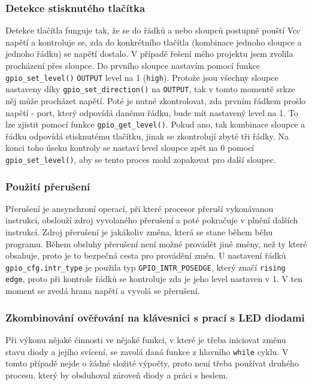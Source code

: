 \documentclass[a4paper, 11pt]{article}
\begin{document}
\subsubsection{Detekce stisknutého tlačítka}
Detekce tlačítla funguje tak, že se do řádků a nebo sloupců postupně pouští Vcc napětí a kontroluje se, zda do konkrétního tlačítla (kombinace jednoho sloupce a jednoho řádku) se napětí dostalo. V případě řešení mého projektu jsem zvolila procházení přes sloupce. Do prvního sloupce nastavím pomocí funkce \verb!gpio_set_level()! \verb!OUTPUT! level na 1 (\verb!high!). Protože jsou všechny sloupce nastaveny díky \verb!gpio_set_direction()! na \verb!OUTPUT!, tak v tomto momentě srkze něj může procházet napětí. Poté je nutné zkontrolovat, zda prvním řádkem prošlo napětí - port, který odpovídá danému řádku, bude mít nastavený level na 1. To lze zjistit pomocí funkce \verb!gpio_get_level()!. Pokud ano, tak kombinace sloupce a řádku odpovídá stisknutému tlačítku, jinak se zkontrolují zbyté tři řádky. Na konci toho úseku kontroly se nastaví level sloupce zpět na 0 pomocí \verb!gpio_set_level()!, aby se tento proces mohl zopakovat pro další sloupec.

\subsubsection{Použití přerušení}
Přerušení je ansynchroní operací, při které procesor přeruší vykonávanou instrukci, obslouží zdroj vyvolaného přerušení a poté pokračuje v plnění dalších instrukcí. Zdroj přerušení je jakákoliv změna, která se stane během běhu programu. Během obsluhy přerušení není možné provádět jiné změny, než ty které obsahuje, proto je to bezpečná cesta pro provádění změn. U nastavení řádků \verb!gpio_cfg.intr_type! je použila typ \verb!GPIO_INTR_POSEDGE!, který značí \verb!rising edge!, proto při kontrole řádků se kontroluje zda je jeho level nastaven v 1. V ten moment se zvedá hrana napětí a vyvolá se přerušení.

\subsubsection{Zkombinování ověřování na klávesnici s prací s LED diodami}
Při výkonu nějaké činnosti ve nějaké funkci, v které je třeba iniciovat změnu stavu diody a jejího svícení, se zavolá daná funkce z hlavního \verb!while! cyklu. V tomto případě nejde o žádné složité výpočty, proto není třeba používat druhého procesu, který by obsluhoval zároveň diody a práci s heslem.
\end{document}
